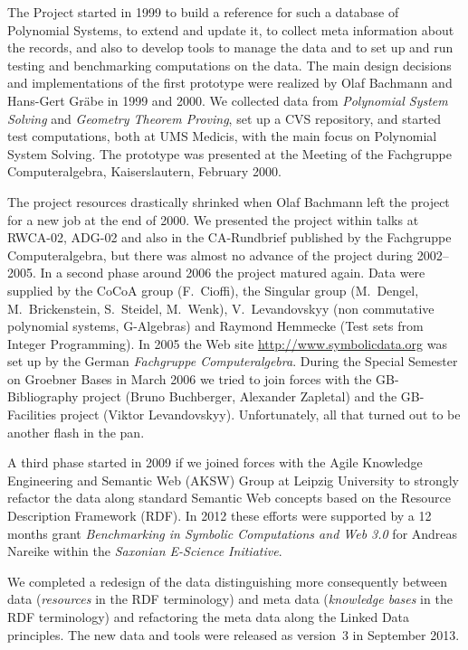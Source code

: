 \documentclass[a4paper,11pt]{article}
\begin{document}
\begin{multicols}{2}
The {\SD} Project started in 1999 to build a reference for such a database of
Polynomial Systems, to extend and update it, to collect meta information about
the records, and also to develop tools to manage the data and to set up and
run testing and benchmarking computations on the data. The main design
decisions and implementations of the first prototype were realized by Olaf
Bachmann and Hans-Gert Gr\"abe in 1999 and 2000. We collected data from
\emph{Polynomial System Solving} and \emph{Geometry Theorem Proving}, set up a
CVS repository, and started test computations, both at UMS Medicis, with the
main focus on Polynomial System Solving. The prototype was presented at the
Meeting of the Fachgruppe Computeralgebra, Kaiserslautern, February 2000.

The project resources drastically shrinked when Olaf Bachmann left the project
for a new job at the end of 2000.  We presented the project within talks at
RWCA-02, ADG-02 and also in the CA-Rundbrief published by the Fachgruppe
Computeralgebra, but there was almost no advance of the project during
2002--2005.  In a second phase around 2006 the project matured again. Data
were supplied by the CoCoA group (F.~Cioffi), the Singular group (M.~Dengel,
M.~Brickenstein, S.~Steidel, M.~Wenk), V.~Levandovskyy (non commutative
polynomial systems, G-Algebras) and Raymond Hemmecke (Test sets from Integer
Programming). In 2005 the Web site \url{http://www.symbolicdata.org} was set
up by the German \emph{Fachgruppe Computeralgebra}. During the Special
Semester on Groebner Bases in March 2006 we tried to join forces with the
GB-Bibliography project (Bruno Buchberger, Alexander Zapletal) and the
GB-Facilities project (Viktor Levandovskyy). Unfortunately, all that turned
out to be another flash in the pan.

A third phase started in 2009 if we joined forces with the Agile Knowledge
Engineering and Semantic Web (AKSW) Group at Leipzig University to strongly
refactor the data along standard Semantic Web concepts based on the Resource
Description Framework (RDF).  In 2012 these efforts were supported by a 12
months grant \emph{Benchmarking in Symbolic Computations and Web 3.0} for
Andreas Nareike within the \emph{Saxonian E-Science Initiative}.

We completed a redesign of the data distinguishing more consequently between
data (\emph{resources} in the RDF terminology) and meta data (\emph{knowledge
  bases} in the RDF terminology) and refactoring the meta data along the
Linked Data principles.  The new {\SD} data and tools were released as
version~3 in September 2013.  


\end{multicols}
\end{document}
